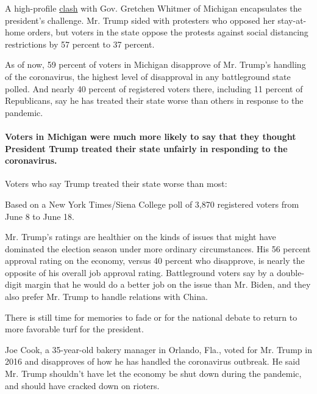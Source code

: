 A high-profile
\href{https://www.nytimes.com/2020/05/31/us/politics/michigan-trump-election.html}{clash}
with Gov. Gretchen Whitmer of Michigan encapsulates the president's
challenge. Mr. Trump sided with protesters who opposed her stay-at-home
orders, but voters in the state oppose the protests against social
distancing restrictions by 57 percent to 37 percent.

As of now, 59 percent of voters in Michigan disapprove of Mr. Trump's
handling of the coronavirus, the highest level of disapproval in any
battleground state polled. And nearly 40 percent of registered voters
there, including 11 percent of Republicans, say he has treated their
state worse than others in response to the pandemic.

\hypertarget{voters-in-michigan-were-much-more-likely-to-say-that-they-thought-president-trump-treated-their-state-unfairly-in-responding-to-the-coronavirus}{%
\paragraph{Voters in Michigan were much more likely to say that they
thought President Trump treated their state unfairly in responding to
the
coronavirus.}\label{voters-in-michigan-were-much-more-likely-to-say-that-they-thought-president-trump-treated-their-state-unfairly-in-responding-to-the-coronavirus}}

Voters who say Trump treated their state worse than most:

Based on a New York Times/Siena College poll of 3,870 registered voters
from June 8 to June 18.

Mr. Trump's ratings are healthier on the kinds of issues that might have
dominated the election season under more ordinary circumstances. His 56
percent approval rating on the economy, versus 40 percent who
disapprove, is nearly the opposite of his overall job approval rating.
Battleground voters say by a double-digit margin that he would do a
better job on the issue than Mr. Biden, and they also prefer Mr. Trump
to handle relations with China.

There is still time for memories to fade or for the national debate to
return to more favorable turf for the president.

Joe Cook, a 35-year-old bakery manager in Orlando, Fla., voted for Mr.
Trump in 2016 and disapproves of how he has handled the coronavirus
outbreak. He said Mr. Trump shouldn't have let the economy be shut down
during the pandemic, and should have cracked down on rioters.

